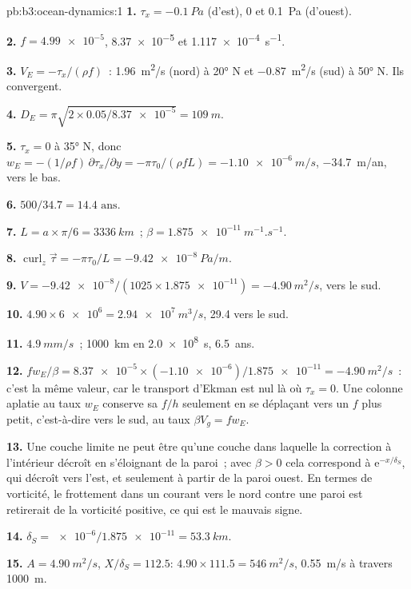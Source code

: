 \begin{solution}{pb:b3:ocean-dynamics:1}
\textbf{1.} $\tau_x = \qty{-0.1}{Pa}$ (d'est), 0 et \qty{+0.1}{Pa}
(d'ouest).

\textbf{2.} $f = \num{4.99e-5}$, \num{8.37e-5} et
\qty{1.117e-4}{s^{-1}}.

\textbf{3.} $V_E = -\tau_x/(\rho f)$~: \qty{+1.96}{m^2/s} (nord) à
\ang{20} N et \qty{-0.87}{m^2/s} (sud) à \ang{50} N. Ils convergent.

\textbf{4.} $D_E = \pi\sqrt{2\times0.05/\num{8.37e-5}} = \qty{109}{m}$.

\textbf{5.} $\tau_x = 0$ à \ang{35} N, donc $w_E = -(1/\rho f)\,
\partial\tau_x/\partial y = -\pi\tau_0/(\rho fL) = \qty{-1.10e-6}{m/s}$,
\qty{-34.7}{m/an}, vers le bas.

\textbf{6.} $500/34.7 = \num{14.4}\text{ ans}$.

\textbf{7.} $L = a\times\pi/6 = \qty{3336}{km}$~; $\beta =
\qty{1.875e-11}{m^{-1}.s^{-1}}$.

\textbf{8.} $\operatorname{curl}_z\vec\tau = -\pi\tau_0/L =
\qty{-9.42e-8}{Pa/m}$.

\textbf{9.} $V = \num{-9.42e-8}/(1025\times\num{1.875e-11}) =
\qty{-4.90}{m^2/s}$, vers le sud.

\textbf{10.} $4.90\times\num{6e6} = \qty{2.94e7}{m^3/s}$,
\qty{29.4}{\sverdrup} vers le sud.

\textbf{11.} $\qty{4.9}{mm/s}$~; \qty{1000}{km} en \qty{2.0e8}{s},
\num{6.5}~ans.

\textbf{12.} $fw_E/\beta = \num{8.37e-5}\times(\num{-1.10e-6})/
\num{1.875e-11} = \qty{-4.90}{m^2/s}$~: c'est la même valeur, car le
transport d'Ekman est nul là où $\tau_x = 0$. Une colonne aplatie au taux $w_E$
conserve sa  $f/h$ seulement en se déplaçant vers un $f$ plus petit, c'est-à-dire vers le sud,
au taux $\beta V_g = fw_E$.

\textbf{13.} Une couche limite ne peut être qu'une couche dans laquelle la correction à
l'intérieur décroît en s'éloignant de la paroi~; avec $\beta > 0$ cela correspond à
$\mathrm e^{-x/\delta_S}$, qui décroît vers l'est, et seulement à partir de la paroi ouest.
En termes de vorticité, le frottement dans un courant vers le nord contre une
paroi est retirerait de la vorticité positive, ce qui est le mauvais signe.

\textbf{14.} $\delta_S = \num{e-6}/\num{1.875e-11} = \qty{53.3}{km}$.

\textbf{15.} $A = \qty{4.90}{m^2/s}$, $X/\delta_S = 112.5$:
$4.90\times111.5 = \qty{546}{m^2/s}$, \qty{0.55}{m/s} à travers
\qty{1000}{m}.


\end{solution}
